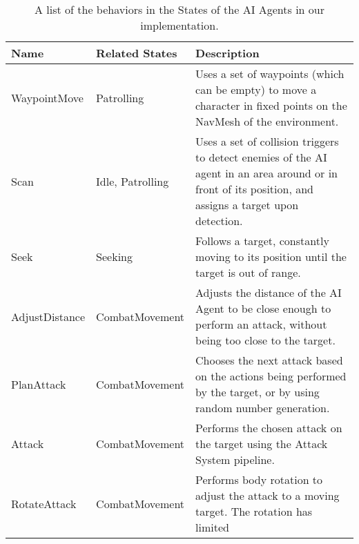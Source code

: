 \begin{table}[!ht]
    \begin{center}
      \caption{A list of the behaviors in the States of the AI Agents in our implementation.}
      \label{tab:ai-behaviors}
      \begin{tabular}{ >{\small}w{l}{6em} >{\small}w{l}{7em} >{\small}m{17em} } %
        \addlinespace
        \toprule
        \bf Name       & \bf Related States  & \bf Description                              \\
        \midrule
        WaypointMove   & Patrolling          & Uses a set of waypoints (which can be empty)
                                               to move a character in fixed points on the 
                                               NavMesh of the environment.                  \\
        Scan           & Idle, Patrolling    & Uses a set of collision triggers to detect   
                                               enemies of the AI agent in an area around
                                               or in front of its position, and assigns a 
                                               target upon detection.                       \\
        Seek           & Seeking             & Follows a target, constantly moving to its
                                               position until the target is out of range.   \\
        AdjustDistance & CombatMovement      & Adjusts the distance of the AI Agent to be 
                                               close enough to perform an attack, without
                                               being too close to the target.               \\
        PlanAttack     & CombatMovement      & Chooses the next attack based on the actions 
                                               being performed by the target, or by using
                                               random number generation.                    \\
        Attack         & CombatMovement      & Performs the chosen attack on the target 
                                               using the Attack System pipeline.            \\
        RotateAttack   & CombatMovement      & Performs body rotation to adjust the attack 
                                               to a moving target. The rotation has limited 

\end{tabular}
\end{center}
\end{table}
